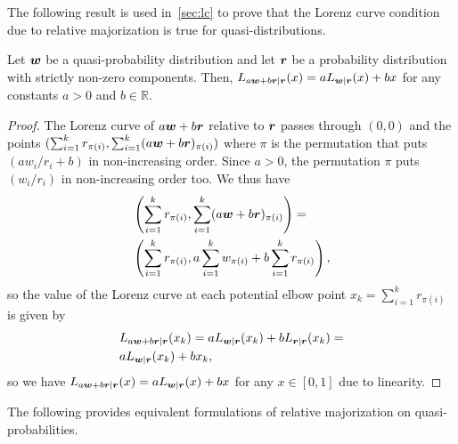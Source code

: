 \documentclass[pra,
aps,
twocolumn,
superscriptaddress,
groupedaddress,
nofootinbib,
reprint
]{revtex4-1}
\begin{document}
The following result is used in~\cref{sec:lc} to prove that the Lorenz curve condition due to relative majorization is true for quasi-distributions.
\begin{proposition}\label{lemma:Lorenz_linearity}
	Let $\boldsymbol{w}$ be a quasi-probability distribution and let $\boldsymbol{r}$ be a probability distribution with strictly non-zero components. 
	Then, $L_{a\boldsymbol{w} + b \boldsymbol{r} | \boldsymbol{r}} (x) = a L_{\boldsymbol{w} |\boldsymbol{r}}(x) + b x$ for any constants $a > 0$ and $b \in \mathbb{R}$.
\end{proposition}
\begin{proof} 
	The Lorenz curve of $a\boldsymbol{w} + b \boldsymbol{r}$ relative to $\boldsymbol{r}$ passes through $(0,0)$ and the points $(\sum_{i=1}^k{r_{\pi(i)}}, \sum_{i=1}^k(a \boldsymbol{w} + b \boldsymbol{r})_{\pi(i)})$ where $\pi$ is the permutation that puts $(a w_i/r_i + b)$ in non-increasing order. Since $a > 0$, the permutation $\pi$ puts  $(w_i/r_i)$ in non-increasing order too. We thus have
\begin{align*}
&\left( \sum_{i=1}^k r_{\pi(i)}, \sum_{i=1}^k(a \boldsymbol{w} + b \boldsymbol{r})_{\pi(i)} \right) = \\ 
&\left( \sum_{i=1}^k r_{\pi(i)},a \sum_{i=1}^k  w_{\pi(i)} + b\sum_{i=1}^k r_{\pi(i)} \right) \nonumber,
\end{align*}
so the value of the Lorenz curve at each potential elbow point $x_k = \sum_{i=1} ^kr_{\pi(i)}$ is given by
\begin{align}
&L_{a \boldsymbol{w} +b \boldsymbol{r}|\boldsymbol{r}} (x_k) = a L_{\boldsymbol{w}|\boldsymbol{r}} (x_k) + b L_{\boldsymbol{r}|\boldsymbol{r}}(x_k) = \nonumber\\
&a L_{\boldsymbol{w}|\boldsymbol{r}} (x_k) + b x_k,
\end{align}
so we have $L_{a\boldsymbol{w}  + b\boldsymbol{r}|\boldsymbol{r}} (x) = a L_{\boldsymbol{w} |\boldsymbol{r}}(x) + b x$ for any $x \in [0,1]$ due to linearity.
\end{proof}
	
The following provides equivalent formulations of relative majorization on quasi-probabilities. 
\end{document}
